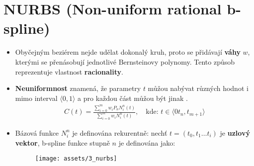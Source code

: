 \section{NURBS (Non-uniform rational b-spline)}
\begin{itemize}
    \item Obyčejným beziérem nejde udělat dokonalý kruh, proto se přidávají \textbf{váhy} $w$, kterými se přenásobují jednotlivé Bernsteinovy polynomy. Tento způsob reprezentuje vlastnost \textbf{racionality}.
    \item \textbf{Neuniformnost} znamená, že parametry $t$ můžou nabývat různých hodnot i mimo interval $\langle0,1\rangle$ a pro každou část můžou být jinak .
          \begin{equation*}
              \begin{array}{c}
                  C(t) = \frac{\sum\limits_{i=0}^m w_i P_n N_i^n (t) }{\sum\limits_{i=0}^m w_i N_i^n (t)}, \quad \textrm{kde: } t \in \langle0t_n, t_{m+1}\rangle
              \end{array}
          \end{equation*}
    \item Bázová funkce $N_i^n$ je definována rekurentně: nechť $t = (t_0, t_1 \ldots t_i)$ je \textbf{uzlový vektor}, b-spline funkce stupně $n$ je definována jako:
          \begin{figure}[H]
              \centering
              \texttt{[image: assets/3\_nurbs]}
          \end{figure}
\end{itemize}